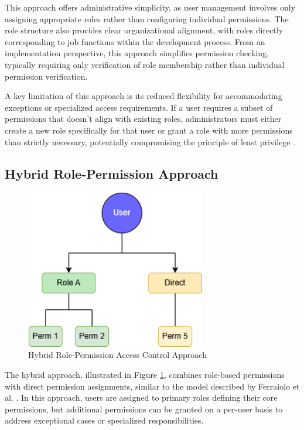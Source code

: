 This approach offers administrative simplicity, as user management involves only assigning appropriate roles rather than configuring individual permissions. The role structure also provides clear organizational alignment, with roles directly corresponding to job functions within the development process. From an implementation perspective, this approach simplifies permission checking, typically requiring only verification of role membership rather than individual permission verification.

A key limitation of this approach is its reduced flexibility for accommodating exceptions or specialized access requirements. If a user requires a subset of permissions that doesn't align with existing roles, administrators must either create a new role specifically for that user or grant a role with more permissions than strictly necessary, potentially compromising the principle of least privilege \cite{sandhu1998role}.

\subsection{Hybrid Role-Permission Approach}
\label{subsec:hybrid-approach}

\begin{figure}[h]
    \centering
    \includegraphics[width=0.7\textwidth]{figures/hybrid_rbac_model.png}
    \caption{Hybrid Role-Permission Access Control Approach}
    \label{fig:hybrid-rbac}
\end{figure}

The hybrid approach, illustrated in Figure \ref{fig:hybrid-rbac}, combines role-based permissions with direct permission assignments, similar to the model described by Ferraiolo et al. \cite{ferraiolo2011policy}. In this approach, users are assigned to primary roles defining their core permissions, but additional permissions can be granted on a per-user basis to address exceptional cases or specialized responsibilities.


